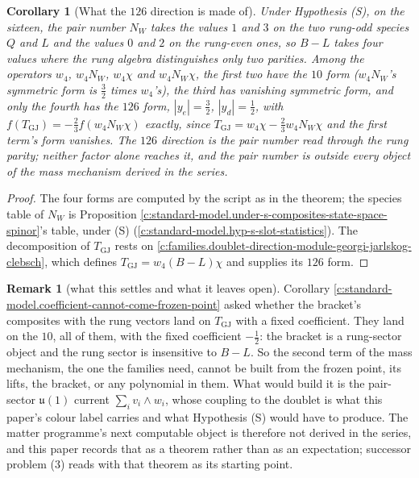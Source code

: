 \documentclass[11pt]{article}
\newtheorem{corollary}[theorem]{Corollary}
\theoremstyle{definition}
\newtheorem{remark}[theorem]{Remark}
\theoremstyle{plain}
\newcommand{\changedmark}[2]{\marginpar{\raggedright\scriptsize\color{#1}#2}}
\providecommand{\uu}{}\renewcommand{\uu}{\mathfrak{u}}
\begin{document}
\begin{corollary}[What the $126$ direction is made of]\label{c:standard-model.what-direction-made}
\changedmark{gray}{reworded}
Under Hypothesis (S), on the sixteen, the pair number $N_{W}$ takes the values $1$ and $3$ on the two rung-odd species $Q$ and $L$ and the values $0$ and $2$ on the rung-even ones, so $B - L$ takes four values where the rung algebra distinguishes only two parities. Among the operators $w_{4}$, $w_{4}N_{W}$, $w_{4}\chi$ and $w_{4}N_{W}\chi$, the first two have the $10$ form ($w_{4}N_{W}$'s symmetric form is $\tfrac32$ times $w_{4}$'s), the third has vanishing symmetric form, and only the fourth has the $126$ form, $|y_{e}| = \tfrac32$, $|y_{d}| = \tfrac12$, with $f(T_{\mathrm{GJ}}) = -\tfrac23 f(w_{4}N_{W}\chi)$ exactly, since $T_{\mathrm{GJ}} = w_{4}\chi - \tfrac23 w_{4}N_{W}\chi$ and the first term's form vanishes. The $126$ direction is the pair number read through the rung parity; neither factor alone reaches it, and the pair number is outside every object of the mass mechanism derived in the series.
\end{corollary}
\begin{proof}
The four forms are computed by the script as in the theorem; the species table of $N_{W}$ is Proposition \ref{c:standard-model.under-s-composites-state-space-spinor}'s table, under (S) (\ref{c:standard-model.hyp-s-slot-statistics}). The decomposition of $T_{\mathrm{GJ}}$ rests on \ref{c:families.doublet-direction-module-georgi-jarlskog-clebsch}, which defines $T_{\mathrm{GJ}} = w_{4}(B - L)\chi$ and supplies its $126$ form.

\end{proof}

\begin{remark}[what this settles and what it leaves open]\label{c:note.standard-model.what-settles-what-it-leaves-open}
Corollary \ref{c:standard-model.coefficient-cannot-come-frozen-point} asked whether the bracket's composites with the rung vectors land on $T_{\mathrm{GJ}}$ with a fixed coefficient. They land on the $10$, all of them, with the fixed coefficient $-\tfrac12$: the bracket is a rung-sector object and the rung sector is insensitive to $B - L$. So the second term of the mass mechanism, the one the families need, cannot be built from the frozen point, its lifts, the bracket, or any polynomial in them. What would build it is the pair-sector $\uu(1)$ current $\sum_{i} v_{i} \wedge w_{i}$, whose coupling to the doublet is what this paper's colour label carries and what Hypothesis (S) would have to produce. The matter programme's next computable object is therefore not derived in the series, and this paper records that as a theorem rather than as an expectation; successor problem (3) reads with that theorem as its starting point.
\end{remark}
\end{document}
